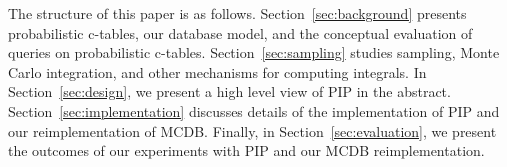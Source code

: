 The structure of this paper is as follows. Section~\ref{sec:background} presents probabilistic c-tables, our database model, and the conceptual  evaluation of queries on probabilistic c-tables. Section~\ref{sec:sampling} studies sampling, Monte
Carlo integration, and other mechanisms for computing integrals.  In Section~\ref{sec:design}, we present a high level view of PIP in the abstract.   Section~\ref{sec:implementation} discusses details of the implementation of PIP and our reimplementation of MCDB.  Finally, in Section~\ref{sec:evaluation}, we present the outcomes of our experiments with PIP and our MCDB reimplementation.